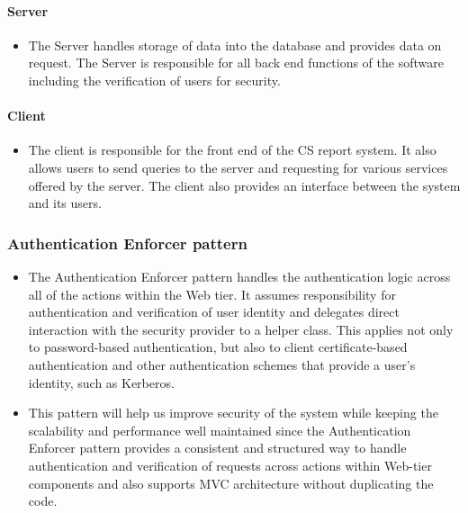 \documentclass{article}
\begin{document}
         \paragraph{Server} %
         \begin{itemize}
          \item The Server handles storage of data into the database and provides data on request. The Server is responsible for all back end functions of the software including the verification 	of users for security.
         
           \end{itemize}
            \paragraph{Client} %
         \begin{itemize}
          \item The client is responsible for the front end of the CS report system. It also allows users to 	send 			queries to the server and requesting for various services offered by the server. The 	client also provides 			an interface between the system  and its users.  	
           \end{itemize}
           
           \subsubsection{Authentication Enforcer pattern} %
           
			 \begin{itemize}
          \item  The Authentication Enforcer pattern handles the authentication logic across all of the actions 						within the Web tier. It assumes responsibility for authentication and veriﬁcation of user identity and 					delegates direct interaction with the security provider to a helper class. This applies not only to 						password-based authentication, but also to client certiﬁcate-based authentication and other 								authentication schemes that provide a user’s identity, such as Kerberos. 
        	\item This pattern will help us improve security of the system while keeping the scalability and 						performance well maintained since the Authentication Enforcer pattern provides a consistent and structured way to handle authentication and veriﬁcation of requests across actions within Web-tier components and also 		supports MVC architecture without duplicating the code.	
           \end{itemize}           
           
\end{document}
